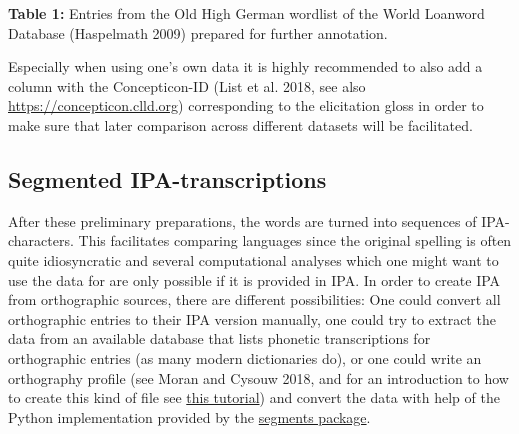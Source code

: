 \documentclass[
  a4paper,
  14pt,
  oneside,
  tablecaptionabove
]{scrbook}
\begin{document}

\textbf{Table 1:} Entries from the Old High German wordlist of the World
Loanword Database (Haspelmath 2009) prepared for further annotation.

Especially when using one's own data it is highly recommended to also
add a column with the Concepticon-ID (List et al. 2018, see also
\url{https://concepticon.clld.org}) corresponding to the elicitation
gloss in order to make sure that later comparison across different
datasets will be facilitated.

\subsection*{Segmented
IPA-transcriptions}

After these preliminary preparations, the words are turned into
sequences of IPA-characters. This facilitates comparing languages since
the original spelling is often quite idiosyncratic and several
computational analyses which one might want to use the data for are only
possible if it is provided in IPA. In order to create IPA from
orthographic sources, there are different possibilities: One could
convert all orthographic entries to their IPA version manually, one
could try to extract the data from an available database that lists
phonetic transcriptions for orthographic entries (as many modern
dictionaries do), or one could write an orthography profile (see Moran
and Cysouw 2018, and for an introduction to how to create this kind of
file see
\href{http://htmlpreview.github.io/?https://raw.githubusercontent.com/digling/calc-seminar/master/handouts/Session_6.html}{this
tutorial}) and convert the data with help of the Python implementation
provided by the \href{https://github.com/cldf/segments}{segments
package}. 
\end{document}
